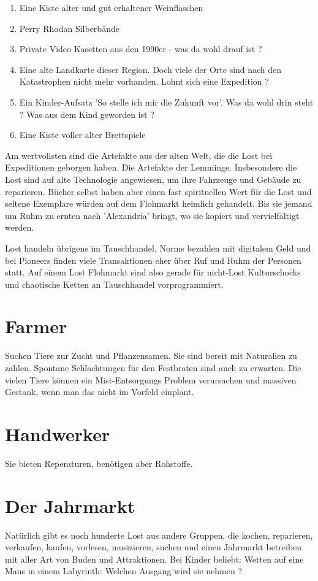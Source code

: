 \begin{enumerate}
    \item Eine Kiste alter und gut erhaltener Weinflaschen
    \item Perry Rhodan Silberbände
    \item Private Video Kasetten aus den 1990er - was da wohl drauf ist ?
    \item Eine alte Landkarte dieser Region. Doch viele der Orte sind nach den Katastrophen nicht mehr vorhanden. Lohnt sich eine Expedition ?
    \item Ein Kinder-Aufsatz 'So stelle ich mir die Zukunft vor'. Was da wohl drin steht ? Was aus dem Kind geworden ist ?
    \item Eine Kiste voller alter Brettspiele
\end{enumerate}

Am wertvollsten sind die Artefakte aus der alten Welt, die die Lost bei Expeditionen geborgen haben. Die Artefakte der Lemminge. Insbesondere die Lost sind auf alte Technologie angewiesen, um ihre Fahrzeuge und Gebäude zu reparieren. Bücher selbst haben aber einen fast spirituellen Wert für die Lost und seltene Exemplare würden auf dem Flohmarkt heimlich gehandelt. Bis sie jemand um Ruhm zu ernten nach 'Alexandria' bringt, wo sie kopiert und vervielfältigt werden.

Lost handeln übrigens im Tauschhandel, Norms bezahlen mit digitalem Geld und bei Pioneers finden viele Transaktionen eher über Ruf und Ruhm der Personen statt. Auf einem Lost Flohmarkt sind also gerade für nicht-Lost Kulturschocks und chaotische Ketten an Tauschhandel vorprogrammiert.

\section{Farmer}

Suchen Tiere zur Zucht und Pflanzensamen. Sie sind bereit mit Naturalien zu zahlen. Spontane Schlachtungen für den Festbraten sind auch zu erwarten. Die vielen Tiere können ein Mist-Entsorgungs Problem verursachen und massiven Gestank, wenn man das nicht im Vorfeld einplant.


\section{Handwerker}

Sie bieten Reperaturen, benötigen aber Rohstoffe.

\section{Der Jahrmarkt}

Natürlich gibt es noch hunderte Lost aus andere Gruppen, die kochen, reparieren, verkaufen, kaufen, vorlesen, musizieren, suchen und einen Jahrmarkt betreiben mit aller Art von Buden und Attraktionen. Bei Kinder beliebt: Wetten auf eine Maus in einem Labyrinth: Welchen Ausgang wird sie nehmen ?


